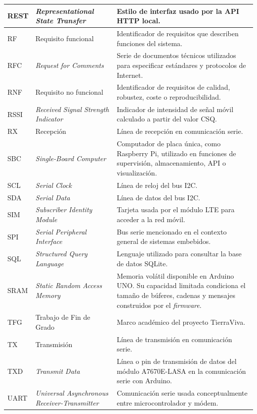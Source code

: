 \begin{longtable}{|p{}|p{}|p{}|}
\hline
REST & \textit{Representational State Transfer} & Estilo de interfaz usado por la API HTTP local. \\
\hline
RF & Requisito funcional & Identificador de requisitos que describen funciones del sistema. \\
\hline
RFC & \textit{Request for Comments} & Serie de documentos técnicos utilizados para especificar estándares y protocolos de Internet. \\
\hline
RNF & Requisito no funcional & Identificador de requisitos de calidad, robustez, coste o reproducibilidad. \\
\hline
RSSI & \textit{Received Signal Strength Indicator} & Indicador de intensidad de señal móvil calculado a partir del valor CSQ. \\
\hline
RX & Recepción & Línea de recepción en comunicación serie. \\
\hline
SBC & \textit{Single-Board Computer} & Computador de placa única, como Raspberry Pi, utilizado en funciones de supervisión, almacenamiento, API o visualización. \\
\hline
SCL & \textit{Serial Clock} & Línea de reloj del bus I2C. \\
\hline
SDA & \textit{Serial Data} & Línea de datos del bus I2C. \\
\hline
SIM & \textit{Subscriber Identity Module} & Tarjeta usada por el módulo LTE para acceder a la red móvil. \\
\hline
SPI & \textit{Serial Peripheral Interface} & Bus serie mencionado en el contexto general de sistemas embebidos. \\
\hline
SQL & \textit{Structured Query Language} & Lenguaje utilizado para consultar la base de datos SQLite. \\
\hline
SRAM & \textit{Static Random Access Memory} & Memoria volátil disponible en Arduino UNO. Su capacidad limitada condiciona el tamaño de búferes, cadenas y mensajes construidos por el \textit{firmware}. \\
\hline
TFG & Trabajo de Fin de Grado & Marco académico del proyecto TierraViva. \\
\hline
TX & Transmisión & Línea de transmisión en comunicación serie. \\
\hline
TXD & \textit{Transmit Data} & Línea o pin de transmisión de datos del módulo A7670E-LASA en la comunicación serie con Arduino. \\
\hline
UART & \textit{Universal Asynchronous Receiver-Transmitter} & Comunicación serie usada conceptualmente entre microcontrolador y módem. \\

\end{longtable}
